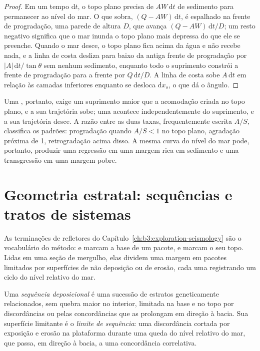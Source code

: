 \begin{proof}
Em um tempo $\mathrm dt$, o topo plano precisa de $AW\,\mathrm dt$ de sedimento para permanecer
ao nível do mar. O que sobra, $(Q - AW)\,\mathrm dt$, é espalhado na frente de progradação,
uma parede de altura $D$, que avança $(Q - AW)\,\mathrm dt/D$; um resto negativo
significa que o mar inunda o topo plano mais depressa do que ele se preenche. Quando o mar
desce, o topo plano fica acima da água e não recebe nada, e a linha de costa
desliza para baixo da antiga frente de progradação por $|A|\,\mathrm dt/\tan\theta$ sem nenhum
sedimento, enquanto todo o suprimento constrói a frente de progradação para a frente por $Q\,\mathrm
dt/D$. A linha de costa sobe $A\,\mathrm dt$ em relação às camadas inferiores
enquanto se desloca $\mathrm dx_s$, o que dá o ângulo.
\end{proof}

Uma , portanto, exige um suprimento maior que a acomodação
criada no topo plano, e a sua trajetória sobe; uma  acontece
independentemente do suprimento, e a sua trajetória desce. A razão entre as duas taxas,
frequentemente escrita $A/S$, classifica os padrões: progradação quando $A/S < 1$ no
topo plano, agradação próxima de 1, retrogradação acima disso. A mesma curva do nível do mar
pode, portanto, produzir uma regressão em uma margem rica em sedimento e uma
transgressão em uma margem pobre.

\section{Geometria estratal: sequências e tratos de sistemas}\label{sec:b3:sequence-stratigraphy:sequences}

As terminações de refletores do Capítulo~\ref{ch:b3:exploration-seismology}
são o vocabulário do método:  e  marcam a base de um
pacote,  e  marcam o seu topo. Lidas em uma seção de mergulho, elas
dividem uma margem em pacotes limitados por superfícies de não deposição ou
de erosão, cada uma registrando um ciclo do nível relativo do mar.

\begin{definition}\label{def:b3:sequence-stratigraphy:sequence}
Uma \emph{sequência deposicional} é uma sucessão
de estratos geneticamente relacionados, sem quebra maior no interior, limitada na base
e no topo por discordâncias ou pelas concordâncias que as prolongam em direção à
bacia. Sua superfície limitante é o \emph{limite de
sequência}: uma discordância cortada por exposição e
erosão na plataforma durante uma queda do nível relativo do mar, que passa, em direção à
bacia, a uma concordância correlativa.
\end{definition}

